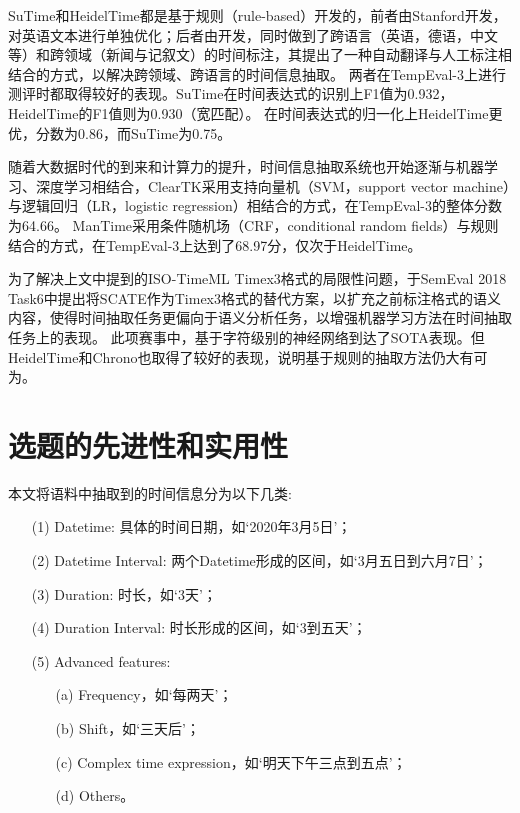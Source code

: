 SuTime和HeidelTime都是基于规则（rule-based）开发的，前者由Stanford开发，对英语文本进行单独优化；后者由\citet{strotgen2010heideltime}开发，同时做到了跨语言（英语，德语，中文等）和跨领域（新闻与记叙文）的时间标注，其提出了一种自动翻译与人工标注相结合的方式，以解决跨领域、跨语言的时间信息抽取。
两者在TempEval-3上进行测评时都取得较好的表现。SuTime在时间表达式的识别上F1值为0.932，HeidelTime的F1值则为0.930（宽匹配）。
在时间表达式的归一化上HeidelTime更优，分数为0.86，而SuTime为0.75。

随着大数据时代的到来和计算力的提升，时间信息抽取系统也开始逐渐与机器学习、深度学习相结合，ClearTK\cite{bethard2013cleartk}采用支持向量机（SVM，support vector machine）与逻辑回归（LR，logistic regression）相结合的方式，在TempEval-3的整体分数为64.66。
ManTime\cite{filannino2013mantime}采用条件随机场（CRF，conditional random fields）与规则结合的方式，在TempEval-3上达到了68.97分，仅次于HeidelTime。

为了解决上文中提到的ISO-TimeML Timex3格式的局限性问题，\citet{laparra2018characters}于SemEval 2018 Task6中提出将SCATE作为Timex3格式的替代方案，以扩充之前标注格式的语义内容，使得时间抽取任务更偏向于语义分析任务，以增强机器学习方法在时间抽取任务上的表现。
此项赛事中，\citet{laparra2018characters}基于字符级别的神经网络到达了SOTA表现。但HeidelTime和Chrono也取得了较好的表现，说明基于规则的抽取方法仍大有可为。

\section{选题的先进性和实用性}

本文将语料中抽取到的时间信息分为以下几类:
\begin{enumerate}
    \item[(1)]  Datetime: 具体的时间日期，如‘2020年3月5日’；
    \item[(2)]  Datetime Interval: 两个Datetime形成的区间，如‘3月五日到六月7日’；
    \item[(3)]  Duration: 时长，如‘3天’；
    \item[(4)]  Duration Interval: 时长形成的区间，如‘3到五天’；
    \item[(5)]  Advanced features:
        \begin{enumerate}
            \item[(a)] Frequency，如‘每两天’；
            \item[(b)] Shift，如‘三天后’；
            \item[(c)] Complex time expression，如‘明天下午三点到五点’；
            \item[(d)] Others。
        \end{enumerate}
\end{enumerate}

